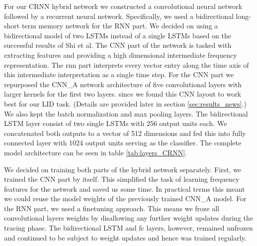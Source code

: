 For our CRNN hybrid network we constructed a convolutional neural network followed by a recurrent neural network. Specifically, we used a bidirectional long-short term memory network for the RNN part. We decided on using a bidirectional model of two LSTMs instead of a single LSTMs based on the successful results of Shi et al\cite{shi2016end}. The CNN part of the network is tasked with extracting features and providing a high dimensional intermediate frequency representation. The \ac{rnn} part interprets every vector entry along the time axis of this intermediate interpretation as a single time step.
For the CNN part we repurposed the CNN\_A network architecture of five convolutional layers with larger kernels for the first two layers. since we found this CNN layout to work best for our LID task. (Details are provided later in section \ref{sec:results_news}.) We also kept the batch normalization and max pooling layers. The bidirectional LSTM layer consist of two single LSTMs with 256 output units each. We concatenated both outputs to a vector of 512 dimensions and fed this into fully connected layer with 1024 output units serving as the classifier. The complete model architecture can be seen in table \ref{tab:layers_CRNN}. 

We decided on training both parts of the hybrid network separately. First, we trained the CNN part by itself. This simplified the task of learning frequency features for the network and saved us some time. In practical terms this meant we could reuse the model weights of the previously trained CNN\_A model. For the RNN part, we used a finetuning approach. This means we froze all convolutional layers weights by disallowing any further weight updates during the tracing phase. The bidirectional LSTM and \ac{fc} layers, however, remained unfrozen and continued to be subject to weight updates and hence was trained regularly.


